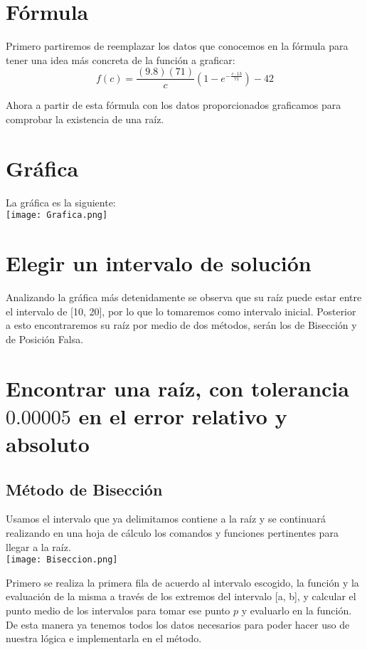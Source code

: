 \documentclass{article}
\begin{document}
\section{Fórmula}
Primero partiremos de reemplazar los datos que conocemos en la fórmula para tener una idea más concreta de la función a graficar:
\[f(c) = \frac{(9.8)(71)}{c}\left(1 - e^{-\frac{c \cdot 13}{71}}\right) - 42\]

Ahora a partir de esta fórmula con los datos proporcionados graficamos para comprobar la existencia de una raíz.

\section{Gráfica}
La gráfica es la siguiente:
\\
\texttt{[image: Grafica.png]}

\section{Elegir un intervalo de solución}
Analizando la gráfica más detenidamente se observa que su raíz puede estar entre el intervalo de [10, 20], por lo que lo tomaremos como intervalo inicial. Posterior a esto encontraremos su raíz por medio de dos métodos, serán los de Bisección y de Posición Falsa.

\section{Encontrar una raíz, con tolerancia \(0.00005\) en el error relativo y absoluto}

\subsection{Método de Bisección}
Usamos el intervalo que ya delimitamos contiene a la raíz y se continuará realizando en una hoja de cálculo los comandos y funciones pertinentes para llegar a la raíz.
\\
\texttt{[image: Biseccion.png]}

Primero se realiza la primera fila de acuerdo al intervalo escogido, la función y la evaluación de la misma a través de los extremos del intervalo [a, b], y calcular el punto medio de los intervalos para tomar ese punto \(p\) y evaluarlo en la función. De esta manera ya tenemos todos los datos necesarios para poder hacer uso de nuestra lógica e implementarla en el método.
\end{document}
